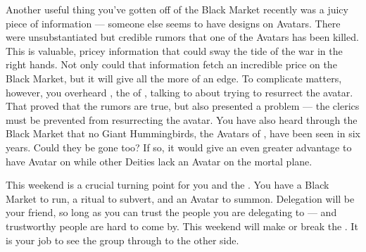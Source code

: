 \documentclass[char]{GL2020}
\begin{document}
Another useful thing you've gotten off of the Black Market recently was a juicy piece of information — someone else seems to have designs on Avatars. There were unsubstantiated but credible rumors that one of the \pShip{} Avatars has been killed. This is valuable, pricey information that could sway the tide of the war in the right hands. Not only could that information fetch an incredible price on the Black Market, but it will give \cGenesis{} all the more of an edge. To complicate matters, however, you overheard \cFlowPriest{\full}, the \cFlowPriest{\cleric} of \cFlow{}, talking to \cInitiate{\full} about trying to resurrect the \cEbb{} avatar. That proved that the rumors are true, but also presented a problem — the \pShip{} clerics must be prevented from resurrecting the \cEbb{} avatar. You have also heard through the Black Market that no Giant Hummingbirds, the Avatars of \cFarmGod{}, have been seen in six years. Could they be gone too? If so, it would give \cGenesis{} an even greater advantage to have \cGenesis{\their} Avatar on \pEarth{} while other Deities lack an Avatar on the mortal plane.

This weekend is a crucial turning point for you and the \pGoaties{}. You have a Black Market to run, a ritual to subvert, and an Avatar to summon. Delegation will be your friend, so long as you can trust the people you are delegating to — and trustworthy people are hard to come by. This weekend will make or break the \pGoaties{}. It is your job to see the group through to the other side.
\end{document}
